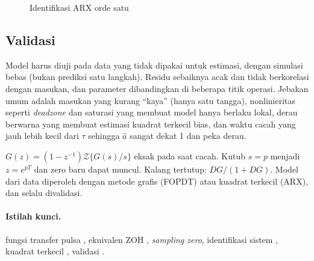 \begin{figure}[H]
	\centering
	\caption{Identifikasi ARX orde satu}
	\label{fig:b4-arx}
\end{figure}

\subsection{Validasi}
Model harus diuji pada data yang tidak dipakai untuk estimasi, dengan simulasi bebas (bukan prediksi satu langkah). Residu sebaiknya acak dan tidak berkorelasi dengan masukan, dan parameter dibandingkan di beberapa titik operasi. Jebakan umum adalah masukan yang kurang ``kaya'' (hanya satu tangga), nonlinieritas seperti \textit{deadzone} dan saturasi yang membuat model hanya berlaku lokal, derau berwarna yang membuat estimasi kuadrat terkecil bias, dan waktu cacah yang jauh lebih kecil dari $\tau$ sehingga $\hat a$ sangat dekat 1 dan peka derau.

\begin{ringkasan}
	$G(z) = (1-z^{-1})\mathcal{Z}\{G(s)/s\}$ eksak pada saat cacah. Kutub $s = p$ menjadi $z = e^{pT}$ dan zero baru dapat muncul. Kalang tertutup: $DG/(1+DG)$. Model dari data diperoleh dengan metode grafis (FOPDT) atau kuadrat terkecil (ARX), dan selalu divalidasi.\\[3pt]
\end{ringkasan}

\paragraph{Istilah kunci.} fungsi transfer pulsa , ekuivalen ZOH , \textit{sampling zero}, identifikasi sistem , kuadrat terkecil , validasi .

